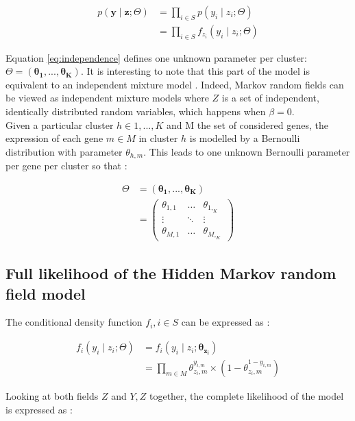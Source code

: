 \begin{align}
p(\boldsymbol{y} \mid \boldsymbol{z} ; \Theta) &= \prod_{i \in S} p(y_i \mid z_i ; \Theta) \nonumber\\
\label{eq:independence}
&= \prod_{i \in S} f_{z_i} (y_i \mid z_i ; \Theta)
\end{align}

Equation \ref{eq:independence} defines one unknown parameter per cluster: $\Theta = (\boldsymbol{\theta_1},...,\boldsymbol{\theta_K})$. It is interesting to note that this part of the model is equivalent to an independent mixture model \cite{mclachlan04}. Indeed, Markov random fields can be viewed as independent mixture models where $Z$ is a set of independent, identically distributed random variables, which happens when $\beta = 0$.\\

Given a particular cluster $h \in {1,...,K}$ and M the set of considered genes, the expression of each gene $m \in M$ in cluster $h$ is modelled by a Bernoulli distribution with parameter $\theta_{h,m}$. This leads to one unknown Bernoulli parameter per gene per cluster so that :

\begin{align*}
\Theta &= (\boldsymbol{\theta_1},...,\boldsymbol{\theta_K})\\
&= \left( \begin{array} {ccc}
\theta_{1,1} & \ldots  & \theta_{1,_K}\\
\vdots & \ddots & \vdots\\
\theta_{M,1} & \ldots & \theta_{M,_K} \end{array} \right)
\end{align*}

	\subsection{Full likelihood of the Hidden Markov random field model}

The conditional density function $f_i, i \in S$ can be expressed as :

\begin{align}
f_i(y_i \mid z_i ; \Theta) &= f_i(y_i \mid z_i ; \boldsymbol{\theta_{z_i}}) \nonumber\\ 
&= \prod_{m \in M} \theta_{z_i,m}^{y_{i,m}} \times (1-\theta_{z_i,m}^{1-y_{i,m}})
\end{align}

Looking at both fields $Z$ and $Y, Z$ together, the complete likelihood of the model is expressed as :

